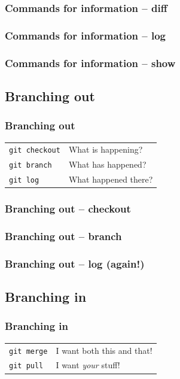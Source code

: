 \documentclass{beamer}
\begin{document}
\begin{frame}
  \frametitle{Commands for information -- diff}
\end{frame}

\begin{frame}
  \frametitle{Commands for information -- log}
\end{frame}

\begin{frame}
  \frametitle{Commands for information -- show}
\end{frame}

\subsection{Branching out}

\begin{frame}[fragile]
  \frametitle{Branching out}

  \begin{tabular}{ll}
    \texttt{git checkout} & What is happening? \\
    \texttt{git branch} & What has happened? \\
    \texttt{git log} & What happened there? \\
  \end{tabular}

\end{frame}

\begin{frame}
  \frametitle{Branching out -- checkout}
\end{frame}

\begin{frame}
  \frametitle{Branching out -- branch}
\end{frame}

\begin{frame}
  \frametitle{Branching out -- log (again!)}
\end{frame}

\subsection{Branching in}

\begin{frame}[fragile]
  \frametitle{Branching in}

  \begin{tabular}{ll}
    \texttt{git merge} & I want both this and that! \\
    \texttt{git pull} & I want \emph{your} stuff! \\
  \end{tabular}

\end{frame}
\end{document}
